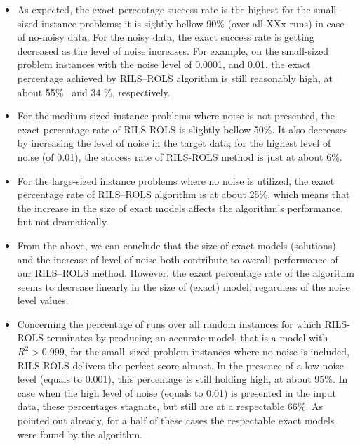 \documentclass{bmcart}
\begin{document}
\begin{itemize}
	\item   As expected, the exact percentage success rate is the highest for the small--sized instance problems; it is sightly bellow 90\% (over all XXx runs) in case of no-noisy data. For the noisy data, the exact success rate is getting decreased as the level of noise increases. For example, on the small-sized problem instances with the noise level  of 0.0001, and 0.01, the exact percentage achieved by \textsc{RILS}--\textsc{ROLS} algorithm is still reasonably high, at about 55\%~ and 34 \%, respectively. 
	\item For the medium-sized instance problems where noise is not presented, the exact percentage rate of \textsc{RILS}-\textsc{ROLS} is slightly bellow 50\%. It also decreases by increasing the level of noise in the target data; for the highest level of noise (of 0.01), the success rate of \textsc{RILS}-\textsc{ROLS} method is just at about 6\%. 
	\item For the large-sized instance problems where no noise is utilized, the exact percentage rate of \textsc{RILS}--\textsc{ROLS} algorithm is at about 25\%, which means that the increase in the size of exact models affects the algorithm's performance, but not dramatically.  
	
	\item From the above, we can conclude that the size of exact models (solutions) and the increase of   level of noise both contribute to overall performance of our \textsc{RILS}--\textsc{ROLS} method. However, the exact percentage rate of the algorithm seems to decrease linearly  in the size of (exact) model, regardless of the noise level values.
	
	\item Concerning  the percentage of  runs over all random instances for which \textsc{RILS-ROLS} terminates by producing an accurate model, that is a model with $R^2 > 0.999$, for the small--sized problem instances where no noise is included, \textsc{RILS}-\textsc{ROLS} delivers  the perfect score almost. In the presence of a low noise level (equals to 0.001), this percentage  is still holding high, at about 95\%. In case when the high level of noise (equals to 0.01) is presented in the input data, these percentages stagnate, but still are at a respectable 66\%. %
	As  pointed out already, for a half of these cases the respectable exact models were found by the algorithm.
	

\end{itemize}
\end{document}
